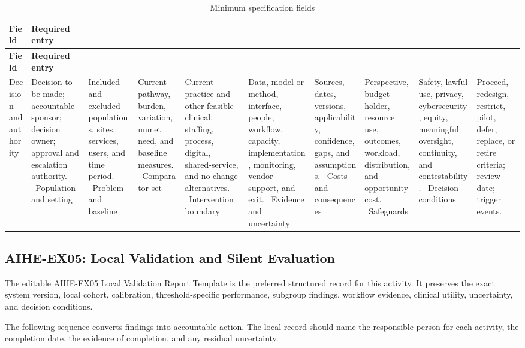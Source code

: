 \begin{longtable}{@{}p{}p{}@{}}
\caption{Minimum specification fields}
\label{tab:comp-ch11-spec-fields}\\
\toprule
\textbf{Field} & \textbf{Required entry} \\
\midrule
\endfirsthead
\toprule
\textbf{Field} & \textbf{Required entry} \\
\midrule
\endhead
\bottomrule
\endlastfoot
Decision and authority & Decision to be made; accountable sponsor; decision owner; approval and escalation authority. \
Population and setting & Included and excluded populations, sites, services, users, and time period. \
Problem and baseline & Current pathway, burden, variation, unmet need, and baseline measures. \
Comparator set & Current practice and other feasible clinical, staffing, process, digital, shared-service, and no-change alternatives. \
Intervention boundary & Data, model or method, interface, people, workflow, capacity, implementation, monitoring, vendor support, and exit. \
Evidence and uncertainty & Sources, dates, versions, applicability, confidence, gaps, and assumptions. \
Costs and consequences & Perspective, budget holder, resource use, outcomes, workload, distribution, and opportunity cost. \
Safeguards & Safety, lawful use, privacy, cybersecurity, equity, meaningful oversight, continuity, and contestability. \
Decision conditions & Proceed, redesign, restrict, pilot, defer, replace, or retire criteria; review date; trigger events. \
\end{longtable}

\subsection{AIHE-EX05: Local Validation and Silent Evaluation}
\label{sec:comp-ch11-supp-2}
The editable AIHE-EX05 Local Validation Report Template is the preferred structured record for this activity. It preserves the exact system version, local cohort, calibration, threshold-specific performance, subgroup findings, workflow evidence, clinical utility, uncertainty, and decision conditions.

The following sequence converts findings into accountable action. The local record
should name the responsible person for each activity, the completion date, the
evidence of completion, and any residual uncertainty.

